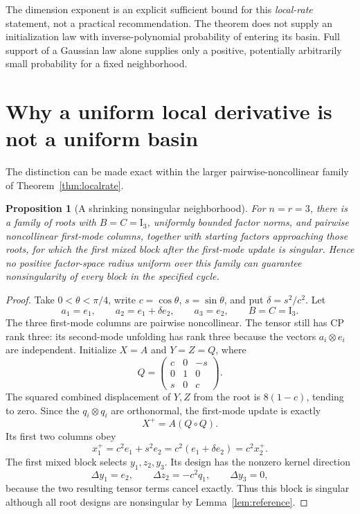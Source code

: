 \documentclass[11pt]{article}
\newtheorem{proposition}[theorem]{Proposition}
\theoremstyle{remark}\newtheorem{remark}[theorem]{Remark}
\newcommand{\Id}{\mathrm I}
\begin{document}
The dimension exponent is an explicit sufficient bound for this \emph{local-rate} statement, not a practical recommendation. The theorem does not supply an initialization law with inverse-polynomial probability of entering its basin. Full support of a Gaussian law alone supplies only a positive, potentially arbitrarily small probability for a fixed neighborhood.

\section{Why a uniform local derivative is not a uniform basin}
The distinction can be made exact within the larger pairwise-noncollinear family of Theorem~\ref{thm:localrate}.

\begin{proposition}[A shrinking nonsingular neighborhood]\label{prop:basin}
For $n=r=3$, there is a family of roots with $B=C=\Id_3$, uniformly bounded factor norms, and pairwise noncollinear first-mode columns, together with starting factors approaching those roots, for which the first mixed block after the first-mode update is singular. Hence no positive factor-space radius uniform over this family can guarantee nonsingularity of every block in the specified cycle.
\end{proposition}
\begin{proof}
Take $0<\theta<\pi/4$, write $c=\cos\theta$, $s=\sin\theta$, and put $\delta=s^2/c^2$. Let
\[
 a_1=e_1,\qquad a_2=e_1+\delta e_2,\qquad a_3=e_2,
 \qquad B=C=\Id_3.
\]
The three first-mode columns are pairwise noncollinear. The tensor still has CP rank three: its second-mode unfolding has rank three because the vectors $a_i\otimes e_i$ are independent. Initialize $X=A$ and $Y=Z=Q$, where
\[
 Q=\begin{pmatrix}c&0&-s\\0&1&0\\s&0&c\end{pmatrix}.
\]
The squared combined displacement of $Y,Z$ from the root is $8(1-c)$, tending to zero. Since the $q_i\otimes q_i$ are orthonormal, the first-mode update is exactly
\[
 X^+=A(Q\circ Q).
\]
Its first two columns obey
\[
 x_1^+=c^2e_1+s^2e_2=c^2(e_1+\delta e_2)=c^2x_2^+.
\]
The first mixed block selects $y_1,z_2,y_3$. Its design has the nonzero kernel direction
\[
 \Delta y_1=e_2,\qquad \Delta z_2=-c^2q_1,\qquad \Delta y_3=0,
\]
because the two resulting tensor terms cancel exactly. Thus this block is singular although all root designs are nonsingular by Lemma~\ref{lem:reference}.
\end{proof}
\end{document}
